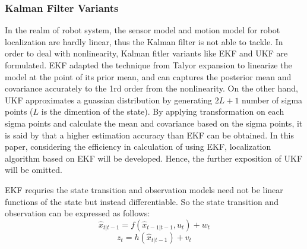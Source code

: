 \subsubsection{Kalman Filter Variants}
In the realm of robot system, the sensor model and motion model for robot localization are hardly linear, thus the Kalman filter is not able to tackle. In order to deal with nonlinearity, Kalman fitler variants like \gls{EKF} and \gls{UKF} are formulated. \gls{EKF} adapted the technique from Talyor expansion to linearize the model at the point of its prior mean, and can captures the posterior mean and covariance accurately to the 1rd order from the nonlinearity. On the other hand, \gls{UKF} approximates a guassian distribution by generating $2L+1$ number of sigma points ($L$ is the dimention of the state). By applying transformation on each sigma points and calculate the mean and covariance based on the sigma points, it is said by \cite{Wan2000} that a higher estimation accuracy than \gls{EKF} can be obtained. In this paper, considering the efficiency in calculation of using \gls{EKF}, localization algorithm based on \gls{EKF} will be developed. Hence, the further exposition of \gls{UKF} will be omitted.

\gls{EKF} requries the state transition and observation models need not be linear functions of the state but instead differentiable. So the state transition and observation can be expressed as follows: 
\begin{equation}
\hat{x}_{t|t-1} = f(\hat{x}_{t-1|t-1}, u_{t}) + w_{t} 
  \label{eq:trans}
\end{equation}
\begin{equation}
z_{t} = h(\hat{x}_{t|t-1}) + v_{t}
  \label{eq:observ}
\end{equation}

